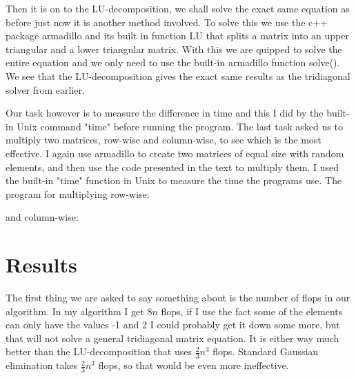 \documentclass[12pt,a4wide]{article}
\begin{document}
Then it is on to the LU-decomposition, we shall solve the exact same equation as before just now it is another method involved. 
To solve this we use the c++ package armadillo and its built in function LU that splits a matrix into an upper triangular and a lower triangular matrix.
With this we are quipped to solve the entire equation and we only need to use the built-in armadillo function solve(). We see
that the LU-decomposition gives the exact same results as the tridiagonal solver from earlier.
 
Our task however is to measure the difference in time and this I did by the built-in Unix command "time" before running the program.
The last task asked us to multiply two matrices, row-wise and column-wise, to see which is the most effective. I again use armadillo to create
two matrices of equal size with random elements, and then use the code presented in the text to multiply them. I used the built-in "time" function in Unix to measure the time the programs use.
The program for multiplying row-wise:

and column-wise:
 

\section*{Results}
The first thing we are asked to say something about is the number of flops in our algorithm. In my algorithm I get
${8}{n}$ flops, if I use the fact some of the elements can only have the values -1 and 2 I could probably get it down some more,
but that will not solve a general tridiagonal matrix equation. It is either way much better than the LU-decomposition that uses
$\frac{2}{3} {n^3}$ flops. Standard Gaussian elimination takes $\frac{2}{3} {n^3}$ flops, so that would be even more ineffective.
\end{document}
